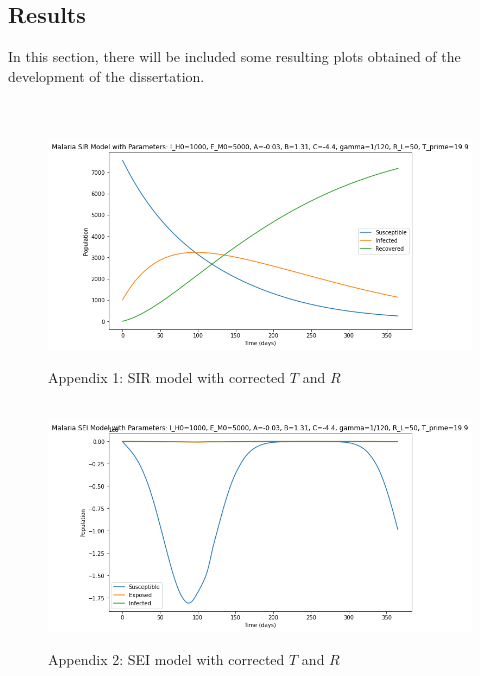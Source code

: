 \documentclass[
	12pt,				%
	oneside,			%
	a4paper,			%
	english,			%
	brazil				%
	]{abntex2}
\begin{document}
\begin{apendicesenv}

\partapendices

\chapter{Results}
In this section, there will be included some resulting plots  
obtained of the development of the dissertation.
\\\\

\begin{figure}[!ht]
	\centering
	\hbox{\hspace{2.0em} \includegraphics[scale=0.55] {THESIS-SIR_T_e_R_adaptados_CORRECAO.png}}
	\caption*{Appendix 1: SIR model with corrected $T$ and $R$}
\end{figure} 
\begin{figure}[!ht]
	\centering
	\hbox{\hspace{2.5em} \includegraphics[scale=0.55] {THESIS-SEI_T_e_R_adaptados_CORRECAO.png}}
	\caption*{Appendix 2: SEI model with corrected $T$ and $R$}

\end{figure}
\end{apendicesenv}
\end{document}
